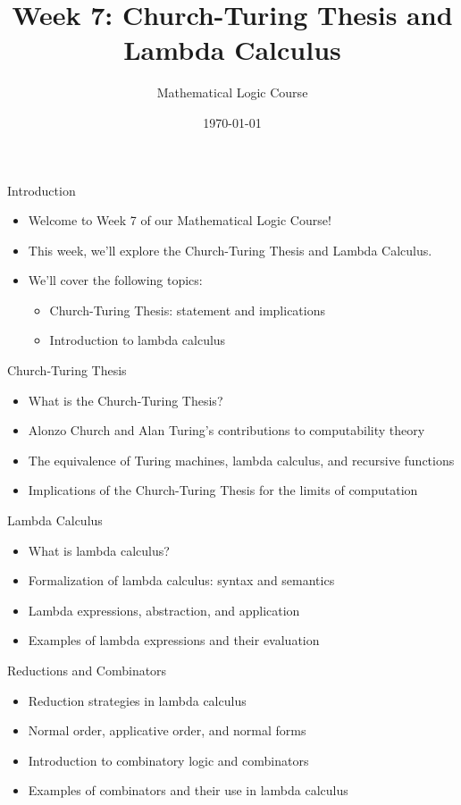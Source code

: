 \documentclass[presentation]{beamer}
\author{Mathematical Logic Course}
\date{\today}
\title{Week 7: Church-Turing Thesis and Lambda Calculus}
\begin{document}
\maketitle

\begin{frame}[label={sec:orga4a6093}]{Introduction}
\begin{itemize}
\item Welcome to Week 7 of our Mathematical Logic Course!
\item This week, we'll explore the Church-Turing Thesis and Lambda Calculus.
\item We'll cover the following topics:
\begin{itemize}
\item Church-Turing Thesis: statement and implications
\item Introduction to lambda calculus
\end{itemize}
\end{itemize}
\end{frame}

\begin{frame}[label={sec:org160b7ee}]{Church-Turing Thesis}
\begin{itemize}
\item What is the Church-Turing Thesis?
\item Alonzo Church and Alan Turing's contributions to computability theory
\item The equivalence of Turing machines, lambda calculus, and recursive functions
\item Implications of the Church-Turing Thesis for the limits of computation
\end{itemize}
\end{frame}

\begin{frame}[label={sec:org5d58fdf}]{Lambda Calculus}
\begin{itemize}
\item What is lambda calculus?
\item Formalization of lambda calculus: syntax and semantics
\item Lambda expressions, abstraction, and application
\item Examples of lambda expressions and their evaluation
\end{itemize}
\end{frame}

\begin{frame}[label={sec:org4addc3a}]{Reductions and Combinators}
\begin{itemize}
\item Reduction strategies in lambda calculus
\item Normal order, applicative order, and normal forms
\item Introduction to combinatory logic and combinators
\item Examples of combinators and their use in lambda calculus
\end{itemize}
\end{frame}
\end{document}
